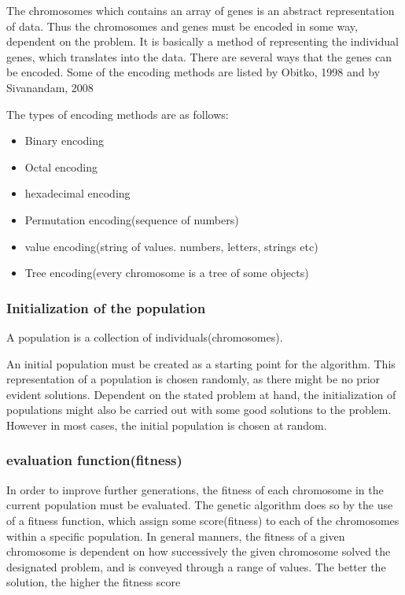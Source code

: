 The chromosomes which contains an array of genes is an abstract representation of data. Thus the chromosomes and genes must be encoded in some way, dependent on the problem. It is basically a method of representing the individual genes, which translates into the data.
There are several ways that the genes can be encoded. Some of the encoding methods are listed by Obitko, 1998 \cite{Marek1998} and by Sivanandam, 2008 \cite[pp.43]{Sivanandam2008}

The types of encoding methods are as follows:
\begin{itemize}
\item Binary encoding
\item Octal encoding
\item hexadecimal encoding
\item Permutation encoding(sequence of numbers)
\item value encoding(string of values. numbers, letters, strings etc)
\item Tree encoding(every chromosome is a tree of some objects)
\end{itemize}


\subsubsection*{Initialization of the population}

A population is a collection of individuals(chromosomes).

An initial population must be created as a starting point for the algorithm. This representation of a population is chosen randomly, as there might be no prior evident solutions. Dependent on the stated problem at hand, the initialization of populations might also be carried out with some good solutions to the problem. However in most cases, the initial population is chosen at random. \cite[pp. 41/42]{Sivanandam2008}


\subsubsection*{evaluation function(fitness)}

In order to improve further generations, the fitness of each chromosome in the current population must be evaluated. The genetic algorithm does so by the use of a fitness function, which assign some score(fitness) to each of the chromosomes within a specific population.
In general manners, the fitness of a given chromosome is dependent on how successively the given chromosome solved the designated problem, and is conveyed through a range of values. The better the solution, the higher the fitness score \cite[pp. 8]{Melanie1990}

